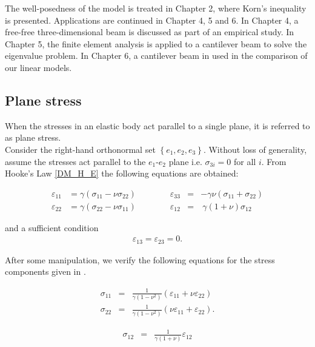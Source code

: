 \documentclass[../../main.tex]{subfiles}
\begin{document}
The well-posedness of the model is treated in Chapter 2, where Korn's inequality is presented. Applications are continued in Chapter 4, 5 and 6. In Chapter 4, a free-free three-dimensional beam is discussed as part of an empirical study. In Chapter 5, the finite element analysis is applied to a cantilever beam to solve the eigenvalue problem. In Chapter 6, a cantilever beam in used in the comparison of our linear models.


\subsection{Plane stress}\label{ssec:3D_Model:PlaneStress}
When the stresses in an elastic body act parallel to a single plane, it is referred to as plane stress.\\

Consider the right-hand orthonormal set $\left\{e_1, e_2, e_3\right\}$. Without loss of generality, assume the stresses act parallel to the $e_1$-$e_2$ plane i.e. $\sigma_{3i} = 0$ for all $i$. From Hooke's Law \eqref{DM_H_E} the following equations are obtained:


\begin{equation}
	\begin{aligned}
		\varepsilon_{11} & =  \gamma  ( \sigma_{11} - \nu \sigma_{22}) \qquad \qquad \varepsilon_{33} & = & - \gamma \nu (\sigma_{11} + \sigma_{22})\\
		\varepsilon_{22} & =   \gamma (\sigma_{22} - \nu\sigma_{11}) \qquad \qquad \varepsilon_{12} & = & \  \gamma (1+\nu) \sigma_{12} \label{strain_comp}
	\end{aligned}	
\end{equation}

and a sufficient condition
\begin{eqnarray}
	\varepsilon_{13} =  \varepsilon_{23} = 0.
\end{eqnarray}

After some manipulation, we verify the following equations for the stress components given in \cite{Fung65}.

\noindent
\begin{minipage}{.5\linewidth}
	\begin{eqnarray*}
		\sigma_{11} & = & \frac{1}{\gamma(1-\nu^2)} ( \varepsilon_{11} + \nu\varepsilon_{22})\\
		\sigma_{22} & = & \frac{1}{\gamma(1-\nu^2)} (\nu \varepsilon_{11} + \varepsilon_{22}).
	\end{eqnarray*}
\end{minipage}%
\begin{minipage}{.5\linewidth}
	\begin{eqnarray}
		\sigma_{12} & = & \frac{1}{\gamma(1+\nu)} \varepsilon_{12} \label{stress_comp}
	\end{eqnarray}
\end{minipage}\\
\end{document}
